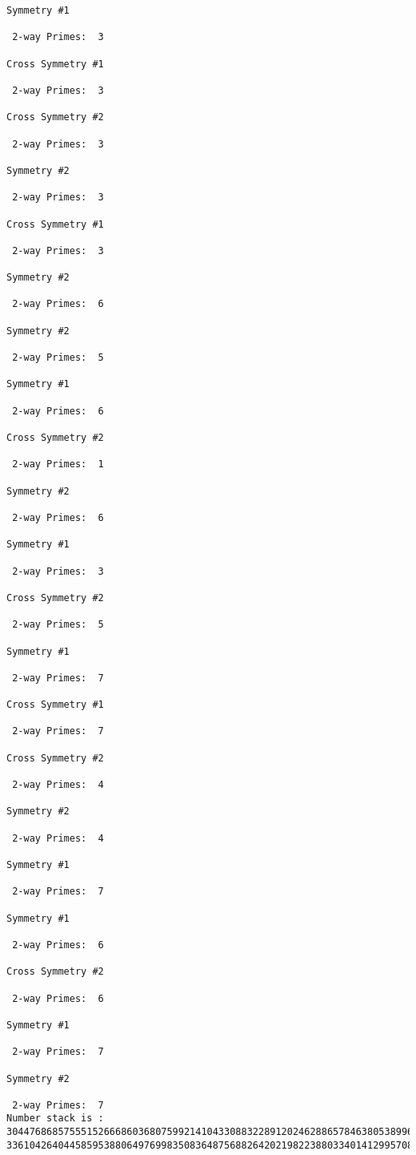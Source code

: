 {{{{\begin{verbatim}
Symmetry #1

 2-way Primes: 	3

Cross Symmetry #1

 2-way Primes: 	3

Cross Symmetry #2

 2-way Primes: 	3

Symmetry #2

 2-way Primes: 	3

Cross Symmetry #1

 2-way Primes: 	3

Symmetry #2

 2-way Primes: 	6

Symmetry #2

 2-way Primes: 	5

Symmetry #1

 2-way Primes: 	6

Cross Symmetry #2

 2-way Primes: 	1

Symmetry #2

 2-way Primes: 	6

Symmetry #1

 2-way Primes: 	3

Cross Symmetry #2

 2-way Primes: 	5

Symmetry #1

 2-way Primes: 	7

Cross Symmetry #1

 2-way Primes: 	7

Cross Symmetry #2

 2-way Primes: 	4

Symmetry #2

 2-way Primes: 	4

Symmetry #1

 2-way Primes: 	7

Symmetry #1

 2-way Primes: 	6

Cross Symmetry #2

 2-way Primes: 	6

Symmetry #1

 2-way Primes: 	7

Symmetry #2

 2-way Primes: 	7
Number stack is :
30447686857555152666860368075992141043308832289120246288657846380538996794608835958544046240163340857
33610426404458595388064976998350836487568826420219822388033401412995708630686662515557586867440375804


\end{verbatim}}}}}
